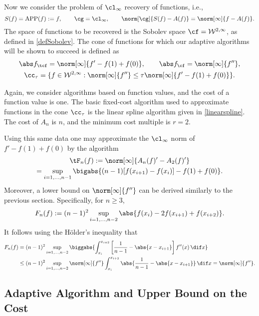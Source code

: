 Now we consider the problem of $\cl_{\infty}$ recovery of functions, i.e.,
\[
S(f)=\APP(f):=f, \qquad \cg=\cl_{\infty}, \qquad \norm[\cg]{S(f)-A(f)}=\norm[\infty]{f-A(f)}.
\]
The space of functions to be recovered is the Sobolev space $\cf = \mathcal{W}^{2,\infty}$, as defined in \eqref{defSobolev}.  The cone of functions for which our adaptive algorithms will be shown to succeed is defined as
\begin{subequations} \label{coneappxdef}
\begin{gather}
\Ftnorm{f}=\norm[\infty]{f'-f(1)+f(0)}, \qquad \Fnorm{f}=\norm[\infty]{f''}, \\
\cc_{\tau}=\{f \in  \mathcal{W}^{2,\infty} : \norm[\infty]{f''}\leq \tau\norm[\infty]{f'-f(1)+f(0)}\}.
\end{gather}
\end{subequations}

Again, we consider algorithms based on function values, and the cost of a function value is one.   The basic fixed-cost algorithm used to approximate functions in the cone $\cc_{\tau}$ is the linear spline algorithm given in \eqref{linearspline}.
The cost of $A_n$ is $n$, and the minimum cost multiple is $r=2$.

Using this same data one may approximate the $\cl_\infty$ norm of $f'-f(1)+f(0)$ by the algorithm
\begin{multline}\label{estfirstderiv}
\tF_n(f) := \norm[\infty]{A_n(f)' - A_2(f)'} \\
= \sup_{i=1, \ldots, n-1} \bigabs{(n-1) [f(x_{i+1})-f(x_i)]-f(1)+f(0)}.
\end{multline}
Moreover, a lower bound on $\norm[\infty]{f''}$ can be derived similarly to the previous section.  Specifically, for $n \ge 3$,
\begin{equation} \label{Fnormappxalg}
F_n(f) := (n-1)^2\sup_{i=1, \ldots, n-2} \abs{f(x_i) - 2 f(x_{i+1})+f(x_{i+2})}.
\end{equation}
It follows using the H\"older's inequality that
\begin{align*}
F_n(f) &= (n-1)^2\sup_{i=1, \ldots, n-2} \biggabs{\int_{x_i}^{x_{i+2}} \left[\frac{1}{n-1} - \abs{x-x_{i+1}}\right] f''(x) \, \dif x} \\
&\le (n-1)^2\sup_{i=1, \ldots, n-2} \norm[\infty]{f''} \int_{x_i}^{x_{i+2}} \abs{\frac{1}{n-1} - \abs{x-x_{i+1}}} \, \dif x = \norm[\infty]{f''}.
\end{align*}

\subsection{Adaptive Algorithm and Upper Bound on the Cost}

